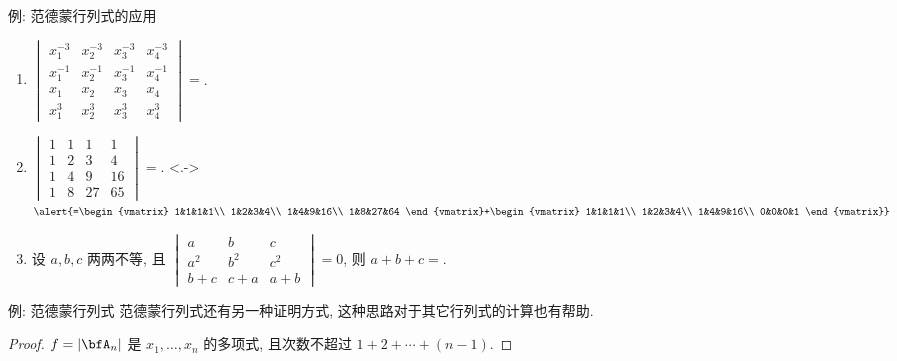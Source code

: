 \begin{frame}{例: 范德蒙行列式的应用}
	\onslide<+->
	\begin{exercise}
		\begin{enumerate}
			\item $\begin{vmatrix}
				x_1^{-3}&x_2^{-3}&x_3^{-3}&x_4^{-3}\\
				x_1^{-1}&x_2^{-1}&x_3^{-1}&x_4^{-1}\\
				x_1&x_2&x_3&x_4\\
				x_1^{3}&x_2^{3}&x_3^{3}&x_4^{3}
			\end{vmatrix}=$.
			\item $\begin{vmatrix}
				1&1&1&1\\
				1&2&3&4\\
				1&4&9&16\\
				1&8&27&65
			\end{vmatrix}=$.
			\onslide<.->{$\alert{=\begin{vmatrix}
				1&1&1&1\\
				1&2&3&4\\
				1&4&9&16\\
				1&8&27&64
			\end{vmatrix}+\begin{vmatrix}
				1&1&1&1\\
				1&2&3&4\\
				1&4&9&16\\
				0&0&0&1
			\end{vmatrix}}$}
			\item 设 $a,b,c$ 两两不等, 且 $\begin{vmatrix}
				a&b&c\\
				a^2&b^2&c^2\\
				b+c&c+a&a+b
			\end{vmatrix}=0$, 则 $a+b+c=$.
		\end{enumerate}
	\end{exercise}
\end{frame}


\begin{frame}{例: 范德蒙行列式\noexer}
	\onslide<+->
	范德蒙行列式还有另一种证明方式, 这种思路对于其它行列式的计算也有帮助.
	\onslide<+->
	\begin{proof}
		$f=|\bfA_n|$ 是 $x_1,\dots,x_n$ 的多项式, 且次数不超过 $1+2+\cdots+(n-1)$.
	\onslide<+->{%
			因此 $g=1$.\qedhere
		}
	\end{proof}
\end{frame}


